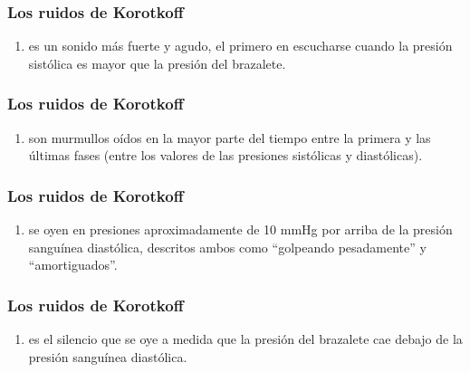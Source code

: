 \documentclass[14pt]{beamer}
\begin{document}
\begin{frame}
\frametitle{Los ruidos de Korotkoff}
\begin{enumerate}[<+->]
\item {} es un sonido más fuerte y agudo, el primero en escucharse cuando la presión sistólica es mayor que la presión del brazalete.
\seti
\end{enumerate}
\end{frame}
\begin{frame}
\frametitle{Los ruidos de Korotkoff}
\begin{enumerate}[<+->]
\conti
\item {} son murmullos oídos en la mayor parte del tiempo entre la primera y las últimas fases (entre los valores de las presiones sistólicas y diastólicas).
\seti
\end{enumerate}
\end{frame}
\begin{frame}
\frametitle{Los ruidos de Korotkoff}
\begin{enumerate}[<+->]
\conti
\item {} se oyen en presiones aproximadamente de 10 mmHg por arriba de la presión sanguínea diastólica, descritos ambos como \enquote{golpeando pesadamente} y \enquote{amortiguados}.
\seti
\end{enumerate}
\end{frame}
\begin{frame}
\frametitle{Los ruidos de Korotkoff}
\begin{enumerate}[<+->]
\conti
\item {} es el silencio que se oye a medida que la presión del brazalete cae debajo de la presión sanguínea diastólica.
\end{enumerate}
\end{frame}
\end{document}

